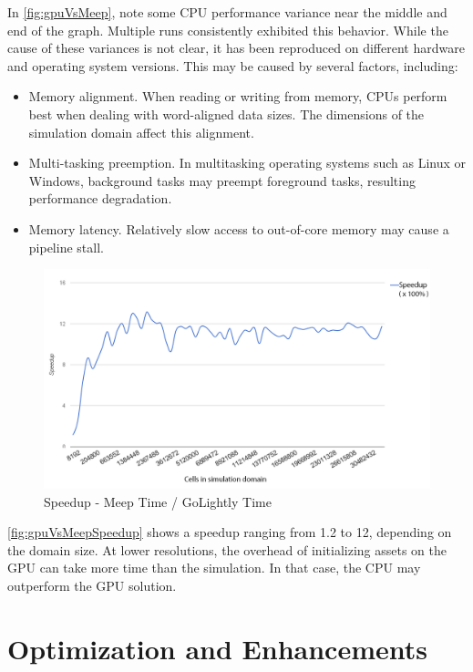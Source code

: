 In \autoref{fig:gpuVsMeep}, note some CPU performance variance near the middle and end of the graph. Multiple runs consistently exhibited this behavior. While the cause of these variances is not clear, it has been reproduced on different hardware and operating system versions. 
This may be caused by several factors, including:

\begin{itemize}
	\item Memory alignment. When reading or writing from memory, CPUs perform best when dealing with word-aligned data sizes. The dimensions of the simulation domain affect this alignment.
	\item Multi-tasking preemption. In multitasking operating systems such as Linux or Windows, background tasks may preempt foreground tasks, resulting performance degradation. 
	\item Memory latency. Relatively slow access to out-of-core memory may cause a pipeline stall.	
\end{itemize}


\begin{figure}[H]
	\centering
	\includegraphics[width=\textwidth,
	keepaspectratio]{gpu-vs-meep-speedup.png}
	\caption{Speedup - Meep Time / GoLightly Time}
	\label{fig:gpuVsMeepSpeedup}
\end{figure}

\autoref{fig:gpuVsMeepSpeedup} shows a speedup ranging from 1.2 to 12, depending on the domain size. At lower resolutions, the overhead of initializing assets on the GPU can take more time than the simulation. In that case, the CPU may outperform the GPU solution.

\section{Optimization and Enhancements}

